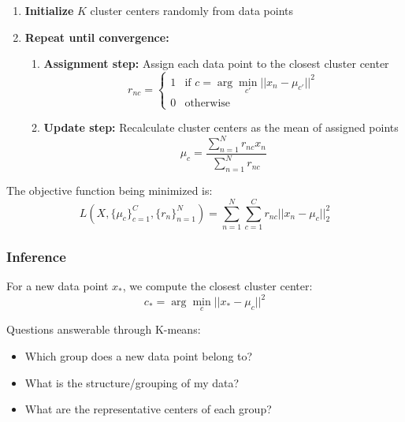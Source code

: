 \documentclass{article}
\begin{document}
\begin{enumerate}
    \item \textbf{Initialize} $K$ cluster centers randomly from data points
    \item \textbf{Repeat until convergence:}
    \begin{enumerate}
        \item \textbf{Assignment step:} Assign each data point to the closest cluster center
        \begin{equation}
            r_{nc} = 
            \begin{cases} 
                1 & \text{if } c = \arg\min_{c'} ||x_n - \mu_{c'}||^2 \\
                0 & \text{otherwise}
            \end{cases}
        \end{equation}
        
        \item \textbf{Update step:} Recalculate cluster centers as the mean of assigned points
        \begin{equation}
            \mu_c = \frac{\sum_{n=1}^N r_{nc}x_n}{\sum_{n=1}^N r_{nc}}
        \end{equation}
    \end{enumerate}
\end{enumerate}

The objective function being minimized is:
\begin{equation}
    L(X, \{\mu_c\}_{c=1}^C, \{r_n\}_{n=1}^N) = \sum_{n=1}^N \sum_{c=1}^C r_{nc}||x_n - \mu_c||^2_2
\end{equation}

\subsubsection{Inference}
For a new data point $x_*$, we compute the closest cluster center:
\begin{equation}
    c_* = \arg\min_c ||x_* - \mu_c||^2
\end{equation}

Questions answerable through K-means:
\begin{itemize}
    \item Which group does a new data point belong to?
    \item What is the structure/grouping of my data?
    \item What are the representative centers of each group?
\end{itemize}
\end{document}
